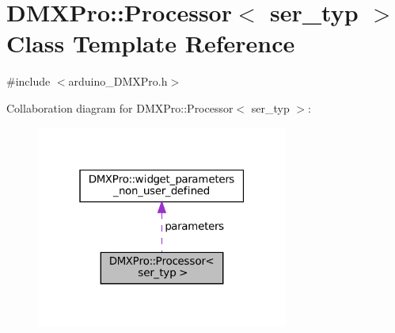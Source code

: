 \hypertarget{classDMXPro_1_1Processor}{}\section{D\+M\+X\+Pro\+:\+:Processor$<$ ser\+\_\+typ $>$ Class Template Reference}
\label{classDMXPro_1_1Processor}


{\ttfamily \#include $<$arduino\+\_\+\+D\+M\+X\+Pro.\+h$>$}



Collaboration diagram for D\+M\+X\+Pro\+:\+:Processor$<$ ser\+\_\+typ $>$\+:\nopagebreak
\begin{figure}[H]
\begin{center}
\leavevmode
\includegraphics[width=235pt]{classDMXPro_1_1Processor__coll__graph}
\end{center}
\end{figure}
